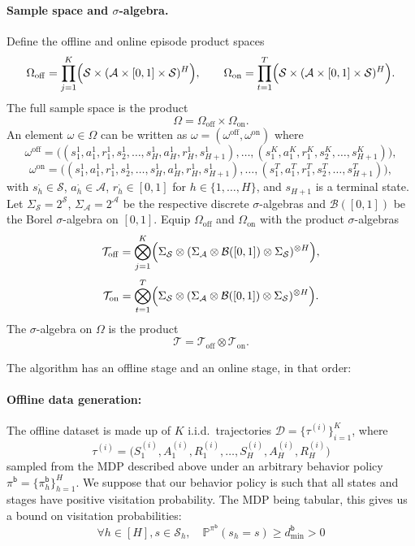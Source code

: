 \documentclass[twoside]{article}
\begin{document}
\paragraph{Sample space and $\sigma$-algebra.}
Define the offline and online episode product spaces
\[
\Omega_{\mathrm{off}}
=
\prod_{j=1}^{K}\Bigl(\mathcal S\times(\mathcal A\times[0,1]\times\mathcal S)^{H}\Bigr),
\qquad
\Omega_{\mathrm{on}}
=
\prod_{t=1}^{T}\Bigl(\mathcal S\times(\mathcal A\times[0,1]\times\mathcal S)^{H}\Bigr).
\]
The full sample space is the product
\[
\Omega=\Omega_{\mathrm{off}}\times\Omega_{\mathrm{on}}.
\]
An element \(\omega\in\Omega\) can be written as \(\omega=(\omega^{\mathrm{off}},\omega^{\mathrm{on}})\) where
\[
\omega^{\mathrm{off}}
=
\bigl(
(s_1^1,a_1^1,r_1^1,s_2^1,\dots,s_H^1,a_H^1,r_H^1,s_{H+1}^1),
\dots,
(s_1^K,a_1^K,r_1^K,s_2^K,\dots,s_{H+1}^K)
\bigr),
\]
\[
\omega^{\mathrm{on}}
=
\bigl(
(s_1^1,a_1^1,r_1^1,s_2^1,\dots,s_H^1,a_H^1,r_H^1,s_{H+1}^1),
\dots,
(s_1^T,a_1^T,r_1^T,s_2^T,\dots,s_{H+1}^T)
\bigr),
\]
with \(s_h^\cdot\in\mathcal S\), \(a_h^\cdot\in\mathcal A\), \(r_h^\cdot\in[0,1]\) for \(h\in\{1,\dots,H\}\), and \(s_{H+1}\) is a terminal state.
Let \(\Sigma_{\mathcal S}=2^{\mathcal S}\), \(\Sigma_{\mathcal A}=2^{\mathcal A}\) be the respective discrete $\sigma$-algebras and \(\mathcal{B}([0,1])\) be the Borel $\sigma$-algebra on \([0,1]\).
Equip \(\Omega_{\mathrm{off}}\) and \(\Omega_{\mathrm{on}}\) with the product $\sigma$-algebras
\[
\mathcal T_{\mathrm{off}}
=
\bigotimes_{j=1}^{K}\Bigl(\Sigma_{\mathcal S}\otimes(\Sigma_{\mathcal A}\otimes\mathcal{B}([0,1])\otimes\Sigma_{\mathcal S})^{\otimes H}\Bigr),
\]
\[
\mathcal T_{\mathrm{on}}
=
\bigotimes_{t=1}^{T}\Bigl(\Sigma_{\mathcal S}\otimes(\Sigma_{\mathcal A}\otimes\mathcal{B}([0,1])\otimes\Sigma_{\mathcal S})^{\otimes H}\Bigr).
\]
The $\sigma$-algebra on \(\Omega\) is the product
\[
\mathcal T=\mathcal T_{\mathrm{off}}\otimes\mathcal T_{\mathrm{on}}.
\]

The algorithm has an offline stage and an online stage, in that order:
\paragraph{Offline data generation:}
The offline dataset is made up of $K$ i.i.d.\ trajectories
$\mathcal{D}=\{\tau^{(i)}\}_{i=1}^K$, where
\[\tau^{(i)}=\big(S^{(i)}_1,A^{(i)}_1,R^{(i)}_1,\dots,S^{(i)}_H,A^{(i)}_H,R^{(i)}_H\big)\]
sampled from the MDP described above under an arbitrary behavior policy $\pi^{\mathsf b}=\{\pi^{\mathsf b}_h\}_{h=1}^H$. We suppose that our behavior policy is such that all states and stages have positive visitation probability. The MDP being tabular, this gives us a bound on visitation probabilities:
\[
\forall h \in [H], s \in \mathcal{S}_h, \quad \mathbb{P}^{\pi^{\mathsf{b}}}(s_h = s) \geq d^{\mathsf b}_{\min} > 0
\]
\end{document}
